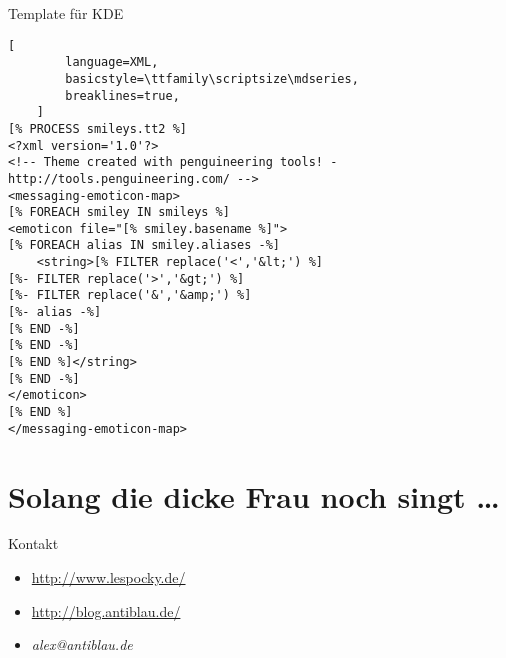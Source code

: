 \documentclass[hyperref={pdfpagelabels=false}]{beamer}
\begin{document}
\begin{frame}[fragile]{Template für KDE}
    \begin{lstlisting}[
        language=XML,
        basicstyle=\ttfamily\scriptsize\mdseries,
        breaklines=true,
    ]
[% PROCESS smileys.tt2 %]
<?xml version='1.0'?>
<!-- Theme created with penguineering tools! - http://tools.penguineering.com/ -->
<messaging-emoticon-map>
[% FOREACH smiley IN smileys %]
<emoticon file="[% smiley.basename %]">
[% FOREACH alias IN smiley.aliases -%]
    <string>[% FILTER replace('<','&lt;') %]
[%- FILTER replace('>','&gt;') %]
[%- FILTER replace('&','&amp;') %]
[%- alias -%]
[% END -%]
[% END -%]
[% END %]</string>
[% END -%]
</emoticon>
[% END %]
</messaging-emoticon-map>
    \end{lstlisting}
\end{frame}

\section*{Solang die dicke Frau noch singt \dots}

\begin{frame}{Kontakt}
    \begin{itemize}
        \item \url{http://www.lespocky.de/}
        \item \url{http://blog.antiblau.de/}
        \item \emph{alex@antiblau.de}
    \end{itemize}
\end{frame}
\end{document}
